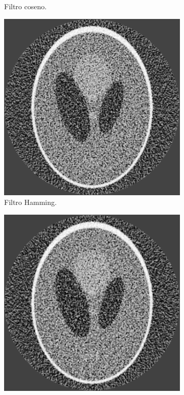 \documentclass[letterpaper,12pt]{article}
\theoremstyle{plain}
\begin{document}
\begin{figure}[H]
\begin{subfigure}[h]{0.32\linewidth}
            \caption{Filtro coseno.}
         \label{fig:noise_coseno}
       \end{subfigure}
         \begin{subfigure}[h]{0.32\linewidth}
            \centering
            \includegraphics[width=\textwidth]{Figuras/reconstruction_hamming_EQ.png}
            \caption{Filtro Hamming.}
            \label{fig:noise_hamming}
         \end{subfigure}
         \begin{subfigure}[h]{0.32\linewidth}
            \centering
            \includegraphics[width=\textwidth]{Figuras/reconstruction_hann_EQ.png}

\end{subfigure}
\end{figure}
\end{document}
